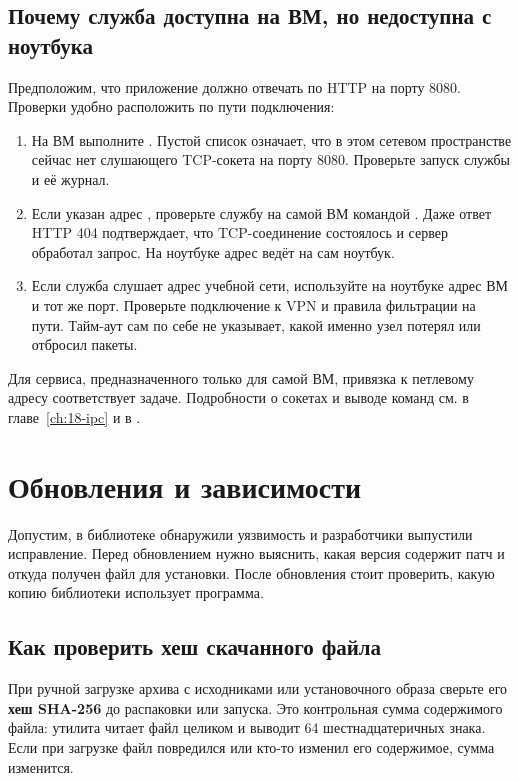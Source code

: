 \subsection{Почему служба доступна на ВМ, но недоступна с ноутбука}

Предположим, что приложение должно отвечать по HTTP на порту 8080.
Проверки удобно расположить по пути подключения:
\begin{enumerate}
  \item На ВМ выполните . Пустой список
    означает, что в этом сетевом пространстве сейчас нет слушающего
    TCP-сокета на порту 8080. Проверьте запуск службы и её журнал.
  \item Если указан адрес , проверьте службу на самой ВМ
    командой . Даже ответ HTTP 404
    подтверждает, что TCP-соединение состоялось и сервер обработал запрос.
    На ноутбуке адрес  ведёт на сам ноутбук.
  \item Если служба слушает адрес учебной сети, используйте на ноутбуке
    адрес ВМ и тот же порт. Проверьте подключение к VPN и правила
    фильтрации на пути. Тайм-аут сам по себе не указывает, какой именно
    узел потерял или отбросил пакеты.
\end{enumerate}
Для сервиса, предназначенного только для самой ВМ, привязка к петлевому
адресу соответствует задаче. Подробности о сокетах и выводе команд
см. в главе~\ref{ch:18-ipc} и в .

\section{Обновления и зависимости}

Допустим, в библиотеке обнаружили уязвимость и разработчики выпустили
исправление. Перед обновлением нужно выяснить, какая версия содержит
патч и откуда получен файл для установки. После обновления стоит
проверить, какую копию библиотеки использует программа.

\subsection{Как проверить хеш скачанного файла}

При ручной загрузке архива с исходниками или установочного образа
сверьте его \textbf{хеш SHA-256} до распаковки или запуска. Это
контрольная сумма содержимого файла: утилита  читает
файл целиком и выводит 64 шестнадцатеричных знака. Если при загрузке
файл повредился или кто-то изменил его содержимое, сумма изменится.

